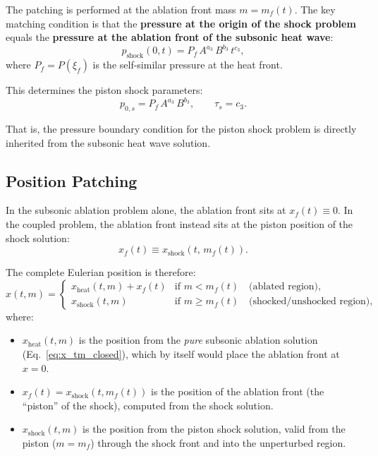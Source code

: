 \documentclass[11pt]{article}
\begin{document}
The patching is performed at the ablation front mass $m = m_f(t)$. The key matching condition is that the \textbf{pressure at the origin of the shock problem} equals the \textbf{pressure at the ablation front of the subsonic heat wave}:
\begin{equation}
  p_{\mathrm{shock}}(0,t) = P_f\,A^{a_3}\,B^{b_3}\,t^{c_3},
  \label{eq:p_match}
\end{equation}
where $P_f = P(\xi_f)$ is the self-similar pressure at the heat front.

This determines the piston shock parameters:
\begin{equation}
  \boxed{
  p_{0,s} = P_f\,A^{a_3}\,B^{b_3}, \qquad \tau_s = c_3.}
  \label{eq:shock_params}
\end{equation}

That is, the pressure boundary condition for the piston shock problem is directly inherited from the subsonic heat wave solution.

\subsection{Position Patching}
\label{sec:pos_patching}

In the subsonic ablation problem alone, the ablation front sits at $x_f(t) \equiv 0$. In the coupled problem, the ablation front instead sits at the piston position of the shock solution:
\begin{equation}
  x_f(t) \equiv x_{\mathrm{shock}}(t,\, m_f(t)).
  \label{eq:xf_shock}
\end{equation}

The complete Eulerian position is therefore:
\begin{equation}
  \boxed{
  x(t,m) = \begin{cases}
    x_{\mathrm{heat}}(t,m) + x_f(t)
      & \text{if } m < m_f(t) \quad \text{(ablated region)}, \\[6pt]
    x_{\mathrm{shock}}(t,m)
      & \text{if } m \geq m_f(t) \quad \text{(shocked/unshocked region)},
  \end{cases}}
  \label{eq:x_stitched}
\end{equation}
where:
\begin{itemize}
  \item $x_{\mathrm{heat}}(t,m)$ is the position from the \emph{pure} subsonic ablation solution (Eq.~\eqref{eq:x_tm_closed}), which by itself would place the ablation front at $x = 0$.
  \item $x_f(t) = x_{\mathrm{shock}}(t,m_f(t))$ is the position of the ablation front (the ``piston'' of the shock), computed from the shock solution.
  \item $x_{\mathrm{shock}}(t,m)$ is the position from the piston shock solution, valid from the piston ($m = m_f$) through the shock front and into the unperturbed region.
\end{itemize}
\end{document}
